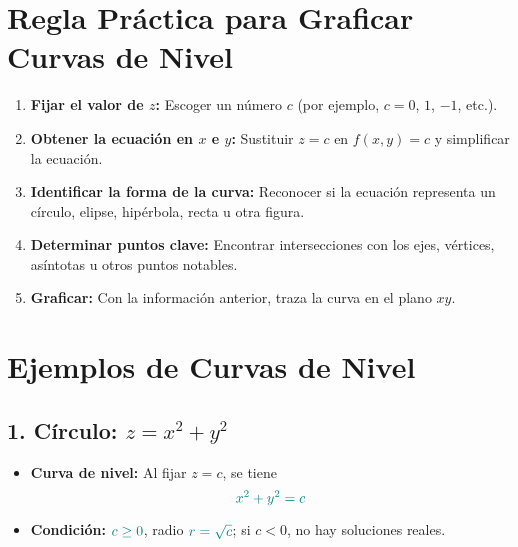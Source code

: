 \documentclass{article}
\begin{document}
\section*{Regla Práctica para Graficar Curvas de Nivel}
\begin{enumerate}[label=\arabic*.]
    \item \textbf{Fijar el valor de \(z\):} Escoger un número \(c\) (por ejemplo, \(c=0\), \(1\), \(-1\), etc.).
    \item \textbf{Obtener la ecuación en \(x\) e \(y\):} Sustituir \(z=c\) en \(f(x,y)=c\) y simplificar la ecuación.
    \item \textbf{Identificar la forma de la curva:} Reconocer si la ecuación representa un círculo, elipse, hipérbola, recta u otra figura.
    \item \textbf{Determinar puntos clave:} Encontrar intersecciones con los ejes, vértices, asíntotas u otros puntos notables.
    \item \textbf{Graficar:} Con la información anterior, traza la curva en el plano \(xy\).
\end{enumerate}

\section*{Ejemplos de Curvas de Nivel}

\subsection*{1. Círculo: \(z=x^2+y^2\)}
\begin{itemize}
    \item \textbf{Curva de nivel:} Al fijar \(z=c\), se tiene \[
    \color{teal} x^2+y^2=c
    \]
    \item \textbf{Condición:} \(\color{teal} c \ge 0\), radio \(\color{teal} r = \sqrt{c}\); si \(c<0\), no hay soluciones reales.
\end{itemize}
\end{document}
